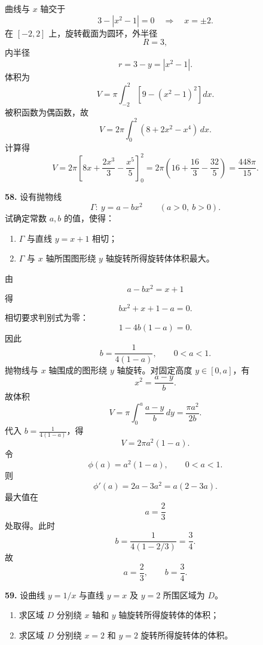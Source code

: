 \begin{solutionblock}
曲线与 \(x\) 轴交于
\[
3-|x^2-1|=0
\quad\Longrightarrow\quad
x=\pm2.
\]
在 \([-2,2]\) 上，旋转截面为圆环，外半径
\[
R=3,
\]
内半径
\[
r=3-y=|x^2-1|.
\]
体积为
\[
V=\pi\int_{-2}^{2}\left[9-(x^2-1)^2\right]dx.
\]
被积函数为偶函数，故
\[
V=2\pi\int_0^2(8+2x^2-x^4)\,dx.
\]
计算得
\[
V=2\pi\left[8x+\frac{2x^3}{3}-\frac{x^5}{5}\right]_0^2
=2\pi\left(16+\frac{16}{3}-\frac{32}{5}\right)
=\boxed{\frac{448\pi}{15}}.
\]
\end{solutionblock}

\begin{problemblock}
\textbf{58.} 设有抛物线
\[
\Gamma:\ y=a-bx^2\qquad(a>0,\ b>0).
\]
试确定常数 \(a,b\) 的值，使得：
\begin{enumerate}
\item \(\Gamma\) 与直线 \(y=x+1\) 相切；
\item \(\Gamma\) 与 \(x\) 轴所围图形绕 \(y\) 轴旋转所得旋转体体积最大。
\end{enumerate}
\end{problemblock}

\begin{solutionblock}
由
\[
a-bx^2=x+1
\]
得
\[
bx^2+x+1-a=0.
\]
相切要求判别式为零：
\[
1-4b(1-a)=0.
\]
因此
\[
b=\frac{1}{4(1-a)},\qquad 0<a<1.
\]
抛物线与 \(x\) 轴围成的图形绕 \(y\) 轴旋转。对固定高度 \(y\in[0,a]\)，有
\[
x^2=\frac{a-y}{b}.
\]
故体积
\[
V=\pi\int_0^a\frac{a-y}{b}\,dy
=\frac{\pi a^2}{2b}.
\]
代入 \(b=\frac{1}{4(1-a)}\)，得
\[
V=2\pi a^2(1-a).
\]
令
\[
\phi(a)=a^2(1-a),\qquad 0<a<1.
\]
则
\[
\phi'(a)=2a-3a^2=a(2-3a).
\]
最大值在
\[
a=\frac23
\]
处取得。此时
\[
b=\frac{1}{4(1-2/3)}=\frac34.
\]
故
\[
\boxed{a=\frac23,\qquad b=\frac34}.
\]
\end{solutionblock}

\begin{problemblock}
\textbf{59.} 设曲线 \(y=1/x\) 与直线 \(y=x\) 及 \(y=2\) 所围区域为 \(D\)。
\begin{enumerate}
\item 求区域 \(D\) 分别绕 \(x\) 轴和 \(y\) 轴旋转所得旋转体的体积；
\item 求区域 \(D\) 分别绕 \(x=2\) 和 \(y=2\) 旋转所得旋转体的体积。
\end{enumerate}
\end{problemblock}

